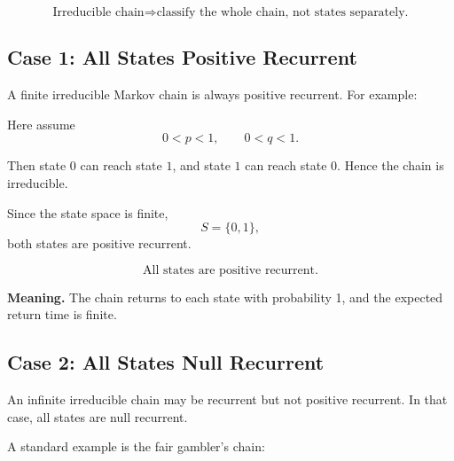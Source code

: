 \documentclass[12pt,a4paper]{article}
\theoremstyle{notestyle}
\begin{document}
\[
\boxed{\text{Irreducible chain} \Rightarrow \text{classify the whole chain, not states separately.}}
\]

\subsection{Case 1: All States Positive Recurrent}

A finite irreducible Markov chain is always positive recurrent. For example:

\begin{center}
\end{center}

Here assume
\[
0<p<1,\qquad 0<q<1.
\]

Then state $0$ can reach state $1$, and state $1$ can reach state $0$. Hence the chain is irreducible.

Since the state space is finite,
\[
S=\{0,1\},
\]
both states are positive recurrent.

\[
\boxed{\text{All states are positive recurrent.}}
\]

\textbf{Meaning.} The chain returns to each state with probability 1, and the expected return time is finite.

\subsection{Case 2: All States Null Recurrent}

An infinite irreducible chain may be recurrent but not positive recurrent. In that case, all states are null recurrent.

A standard example is the fair gambler's chain:
\end{document}
